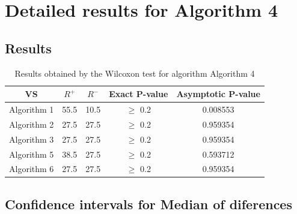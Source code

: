 \documentclass[a4paper,10pt]{article}
\begin{document}
 \clearpage 


\section{Detailed results for Algorithm 4}


\subsection{Results}

\begin{table}[!htp]
\centering\small
\begin{tabular}{
|c|c|c|c|c|}
\hline
 VS & $R^{+}$ & $R^{-}$ & Exact P-value & Asymptotic P-value \\ \hline 
Algorithm 1 & 55.5 & 10.5 & $\geq$ 0.2 & 0.008553\\ \hline 
Algorithm 2 & 27.5 & 27.5 & $\geq$ 0.2 & 0.959354\\ \hline 
Algorithm 3 & 27.5 & 27.5 & $\geq$ 0.2 & 0.959354\\ \hline 
Algorithm 5 & 38.5 & 27.5 & $\geq$ 0.2 & 0.593712\\ \hline 
Algorithm 6 & 27.5 & 27.5 & $\geq$ 0.2 & 0.959354\\ \hline 

\end{tabular}
\caption{Results obtained by the Wilcoxon test for algorithm Algorithm 4}
\end{table}

\subsection{Confidence intervals for Median of diferences}
\end{document}

